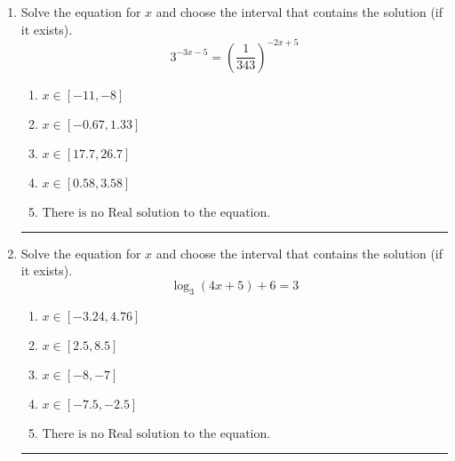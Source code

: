 \documentclass[14pt]{extbook}
\newcommand{\litem}[1]{\item#1\hspace*{-1cm}\rule{\textwidth}{0.4pt}}
\begin{document}
\begin{enumerate}
{\begin{enumerate}[label=\Alph*.]
\end{enumerate} }
\litem{
Solve the equation for $x$ and choose the interval that contains the solution (if it exists).\[ 3^{-3x-5} = \left(\frac{1}{343}\right)^{-2x+5} \]\begin{enumerate}[label=\Alph*.]
\item \( x \in [-11, -8] \)
\item \( x \in [-0.67, 1.33] \)
\item \( x \in [17.7, 26.7] \)
\item \( x \in [0.58, 3.58] \)
\item \( \text{There is no Real solution to the equation.} \)

\end{enumerate} }
\litem{
Solve the equation for $x$ and choose the interval that contains the solution (if it exists).\[ \log_{3}{(4x+5)}+6 = 3 \]\begin{enumerate}[label=\Alph*.]
\item \( x \in [-3.24, 4.76] \)
\item \( x \in [2.5, 8.5] \)
\item \( x \in [-8, -7] \)
\item \( x \in [-7.5, -2.5] \)
\item \( \text{There is no Real solution to the equation.} \)

\end{enumerate} }
\end{enumerate}
\end{document}
